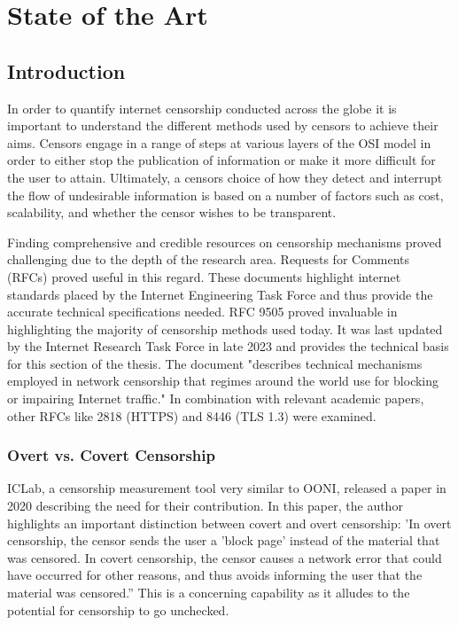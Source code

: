 \chapter{State of the Art}
\section{Introduction}

In order to quantify internet censorship conducted across the globe it is important to understand the different methods used by censors to achieve their aims. Censors engage in a range of steps at various layers of the OSI model in order to either stop the publication of information or make it more difficult for the user to attain. Ultimately, a censors choice of how they detect and interrupt the flow of undesirable information is based on a number of factors such as cost, scalability, and whether the censor wishes to be transparent.

Finding comprehensive and credible resources on censorship mechanisms proved challenging due to the depth of the research area. Requests for Comments (RFCs) proved useful in this regard. These documents highlight internet standards placed by the Internet Engineering Task Force and thus provide the accurate technical specifications needed. RFC 9505 proved invaluable in highlighting the majority of censorship methods used today. It was last updated by the Internet Research Task Force in late 2023 and provides the technical basis for this section of the thesis. The document "describes technical mechanisms employed in network censorship that regimes around the world use for blocking or impairing Internet traffic."\cite{rfc9505} In combination with relevant academic papers, other RFCs like 2818 (HTTPS) \cite{rfc2818} and 8446 (TLS 1.3) \cite{rfc8446} were examined.

\subsection{Overt vs. Covert Censorship }
ICLab, a censorship measurement tool very similar to OONI, released a paper in 2020 describing the need for their contribution. In this paper, the author highlights an important distinction between covert and overt censorship: 'In overt censorship, the censor sends the user a 'block page' instead of the material that was censored. In covert censorship, the censor causes a network error that could have occurred for other reasons, and thus avoids informing the user that the material was censored.” \cite{9152784} This is a concerning capability as it alludes to the potential for censorship to go unchecked. 


